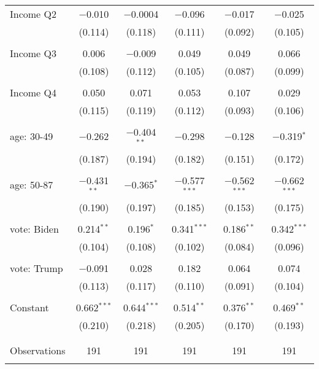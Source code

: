 \begin{tabular}{@{\extracolsep{5pt}}lccccc}
 Income Q2 & $-$0.010 & $-$0.0004 & $-$0.096 & $-$0.017 & $-$0.025 \\ 
  & (0.114) & (0.118) & (0.111) & (0.092) & (0.105) \\ 
  & & & & & \\ 
 Income Q3 & 0.006 & $-$0.009 & 0.049 & 0.049 & 0.066 \\ 
  & (0.108) & (0.112) & (0.105) & (0.087) & (0.099) \\ 
  & & & & & \\ 
 Income Q4 & 0.050 & 0.071 & 0.053 & 0.107 & 0.029 \\ 
  & (0.115) & (0.119) & (0.112) & (0.093) & (0.106) \\ 
  & & & & & \\ 
 age: 30-49 & $-$0.262 & $-$0.404$^{**}$ & $-$0.298 & $-$0.128 & $-$0.319$^{*}$ \\ 
  & (0.187) & (0.194) & (0.182) & (0.151) & (0.172) \\ 
  & & & & & \\ 
 age: 50-87 & $-$0.431$^{**}$ & $-$0.365$^{*}$ & $-$0.577$^{***}$ & $-$0.562$^{***}$ & $-$0.662$^{***}$ \\ 
  & (0.190) & (0.197) & (0.185) & (0.153) & (0.175) \\ 
  & & & & & \\ 
 vote: Biden & 0.214$^{**}$ & 0.196$^{*}$ & 0.341$^{***}$ & 0.186$^{**}$ & 0.342$^{***}$ \\ 
  & (0.104) & (0.108) & (0.102) & (0.084) & (0.096) \\ 
  & & & & & \\ 
 vote: Trump & $-$0.091 & 0.028 & 0.182 & 0.064 & 0.074 \\ 
  & (0.113) & (0.117) & (0.110) & (0.091) & (0.104) \\ 
  & & & & & \\ 
 Constant & 0.662$^{***}$ & 0.644$^{***}$ & 0.514$^{**}$ & 0.376$^{**}$ & 0.469$^{**}$ \\ 
  & (0.210) & (0.218) & (0.205) & (0.170) & (0.193) \\ 
  & & & & & \\ 
\hline \\[-1.8ex] 

Observations & 191 & 191 & 191 & 191 & 191 \\ 
\hline 
\hline \\[-1.8ex] 
\end{tabular} 